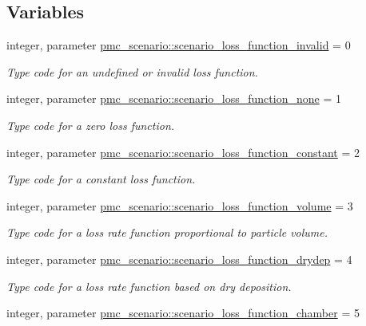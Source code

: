 \subsection*{Variables}
\begin{DoxyCompactItemize}
\item 
integer, parameter \mbox{\hyperlink{namespacepmc__scenario_a2b2e63100da1707d0529fc22239daa8e}{pmc\+\_\+scenario\+::scenario\+\_\+loss\+\_\+function\+\_\+invalid}} = 0
\begin{DoxyCompactList}\small\item\em Type code for an undefined or invalid loss function. \end{DoxyCompactList}\item 
integer, parameter \mbox{\hyperlink{namespacepmc__scenario_a698827c1bd003fdbf988b3813305322e}{pmc\+\_\+scenario\+::scenario\+\_\+loss\+\_\+function\+\_\+none}} = 1
\begin{DoxyCompactList}\small\item\em Type code for a zero loss function. \end{DoxyCompactList}\item 
integer, parameter \mbox{\hyperlink{namespacepmc__scenario_a860cf47bb81e54f7ef8bc666bf7c76f0}{pmc\+\_\+scenario\+::scenario\+\_\+loss\+\_\+function\+\_\+constant}} = 2
\begin{DoxyCompactList}\small\item\em Type code for a constant loss function. \end{DoxyCompactList}\item 
integer, parameter \mbox{\hyperlink{namespacepmc__scenario_ad3122dfa9b3c59624cdef63b4ebd807d}{pmc\+\_\+scenario\+::scenario\+\_\+loss\+\_\+function\+\_\+volume}} = 3
\begin{DoxyCompactList}\small\item\em Type code for a loss rate function proportional to particle volume. \end{DoxyCompactList}\item 
integer, parameter \mbox{\hyperlink{namespacepmc__scenario_a44b0747589f4aac5fb700b51d0861cd0}{pmc\+\_\+scenario\+::scenario\+\_\+loss\+\_\+function\+\_\+drydep}} = 4
\begin{DoxyCompactList}\small\item\em Type code for a loss rate function based on dry deposition. \end{DoxyCompactList}\item 
integer, parameter \mbox{\hyperlink{namespacepmc__scenario_a0e9c46d308800f28d977960a1d5918ae}{pmc\+\_\+scenario\+::scenario\+\_\+loss\+\_\+function\+\_\+chamber}} = 5

\end{DoxyCompactItemize}
